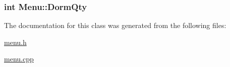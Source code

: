 \subsubsection[{Dorm\+Qty}]{\setlength{\rightskip}{0pt plus 5cm}int Menu\+::\+Dorm\+Qty\hspace{0.3cm}{\ttfamily [protected]}}\label{classMenu_aa39029772c677e7117aff6ba6f9251aa}


The documentation for this class was generated from the following files\+:\begin{DoxyCompactItemize}
\item 
\hyperlink{menu_8h}{menu.\+h}\item 
\hyperlink{menu_8cpp}{menu.\+cpp}\end{DoxyCompactItemize}
